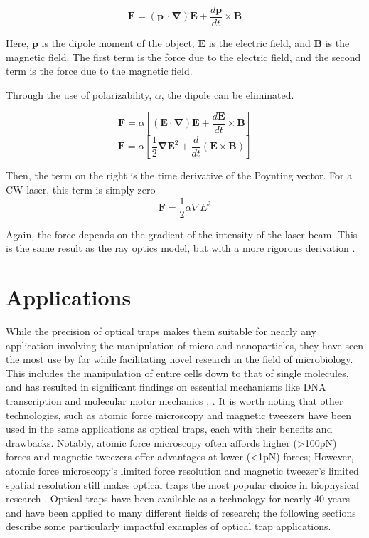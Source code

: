 \documentclass{article}
\begin{document}
\[ \mathbf{F} = (\mathbf{p}\ \cdot\mathbf{\nabla})\mathbf{E} + \frac{d\mathbf{p}}{dt}\times\mathbf{B} \]

Here, $\mathbf{p}$ is the dipole moment of the object, $\mathbf{E}$ is the electric field, and $\mathbf{B}$ is the magnetic field. The first term is the force due to the electric field, and the second term is the force due to the magnetic field.

Through the use of polarizability, $\alpha$, the dipole can be eliminated.

\[ \mathbf{F} = \alpha\left[ (\mathbf{E}\cdot\mathbf{\nabla})\mathbf{E} + \frac{d\mathbf{E}}{dt}\times\mathbf{B} \right]  \]
\[ \mathbf{F} = \alpha\left[ \frac{1}{2}\mathbf{\nabla}\mathbf{E}^2 + \frac{d}{dt}(\mathbf{E}\times\mathbf{B}) \right]  \]

Then, the term on the right is the time derivative of the Poynting vector. For a CW laser, this term is simply zero
\[ \mathbf{F} = \frac{1}{2}\alpha\nabla E^2 \]

Again, the force depends on the gradient of the intensity of the laser beam. This is the same result as the ray optics model, but with a more rigorous derivation \cite{UToronto}.

\newpage
{}
\section*{Applications}

While the precision of optical traps makes them suitable for nearly any application involving the manipulation of micro and nanoparticles, they have seen the most use by far while facilitating novel research in the field of microbiology. This includes the manipulation of entire cells down to that of single molecules, and has resulted in significant findings on essential mechanisms like DNA transcription and molecular motor mechanics \cite{Bustamante2021}, \cite{2018_Polimeno}. It is worth noting that other technologies, such as atomic force microscopy and magnetic tweezers have been used in the same applications as optical traps, each with their benefits and drawbacks. Notably, atomic force microscopy often affords higher (>100pN) forces and magnetic tweezers offer advantages at lower (<1pN) forces; However, atomic force microscopy's limited force resolution and magnetic tweezer's limited spatial resolution still makes optical traps the most popular choice in biophysical research \cite{Bustamante2021}. Optical traps have been available as a technology for nearly 40 years and have been applied to many different fields of research; the following sections describe some particularly impactful examples of optical trap applications.
\end{document}
